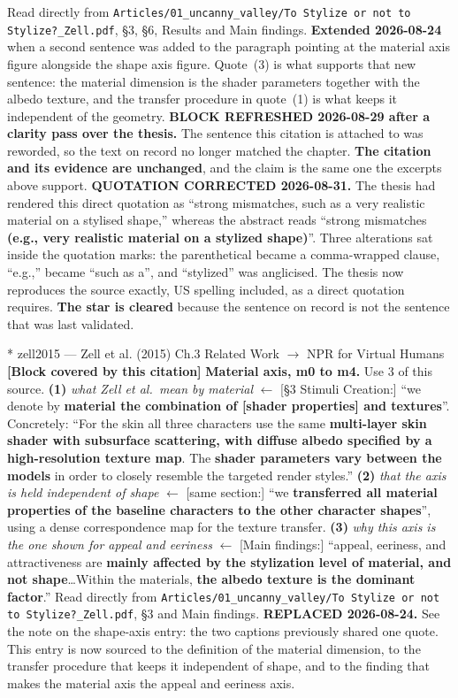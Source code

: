 \documentclass[11pt, a4paper]{article}
\makeatletter
\newcounter{citentry}
\newcommand{\citentry@core}[7]{%
  \stepcounter{citentry}
  \begingroup
  \sbox{\citentry@measurebox}{%
    \begin{minipage}{\linewidth}
      \noindent\colorbox{konstanzblue}{\parbox{\dimexpr\linewidth-2\fboxsep}{%
        \vspace{3pt}
        \textbf{\#\thecitentry \quad #2} \hfill \textit{#3}
        \vspace{3pt}
      }}
      \vspace{3pt}
      \noindent\begin{tabular}{@{}p{2.7cm} p{\dimexpr\linewidth-3cm}@{}}
        \textit{\small Sentence in thesis:} & #4 \\[5pt]
        \textbf{Usage:}\hfill       & #5 \\[5pt]
        \textit{\small Original source:}     & #6 \\[5pt]
        \textbf{How to check:}             & #7 \\
      \end{tabular}
      \vspace{5pt}
      \rule{10pt}{10pt}\quad \textbf{Validated} --- I have read the original and agree it supports the sentence.
    \end{minipage}%
  }%
  \Needspace{\dimexpr\ht\citentry@measurebox+\dp\citentry@measurebox\relax}%
  \endgroup
  \vspace{10pt}
  \noindent\colorbox{konstanzblue}{\parbox{\dimexpr\linewidth-2\fboxsep}{%
    \vspace{3pt}
    \textcolor{white}{\textbf{\#\thecitentry \quad #2}} \hfill \textcolor{white}{\textit{#3}}
    \vspace{3pt}
  }}
  \vspace{3pt}
  \noindent\begin{tabular}{@{}p{2.7cm} p{\dimexpr\linewidth-3cm}@{}}
    \textit{\small Sentence in thesis:} & \textcolor{darkgreen}{#4} \\[5pt]
    \textbf{Usage:}\hfill       & #5 \\[5pt]
    \textit{\small Original source:}     & \textcolor{darkred}{#6} \\[5pt]
    \textbf{How to check:}             & #7 \\
  \end{tabular}
  \vspace{5pt}
  \noindent\CheckBox[name=verified\thecitentry, width=10pt, height=10pt, bordercolor={0 0 0}, borderwidth=0.75, backgroundcolor={1 1 1}#1]{}\quad \textbf{Validated} --- I have read the original and agree it supports the sentence.
  \vspace{3pt}
  \noindent\textcolor{midgray}{\rule{\linewidth}{0.4pt}}
}
\newcommand{\citentry}{\@ifstar{\citentry@core{, checked}}{\citentry@core{}}}
\makeatother
\begin{document}
\begin{Form}
  {Read directly from \texttt{\footnotesize Articles/01\_uncanny\_valley/To Stylize or not to Stylize?\_Zell.pdf}, \S3, \S6, Results and Main findings. \textbf{Extended 2026-08-24} when a second sentence was added to the paragraph pointing at the material axis figure alongside the shape axis figure. Quote~(3) is what supports that new sentence: the material dimension is the shader parameters together with the albedo texture, and the transfer procedure in quote~(1) is what keeps it independent of the geometry. \textbf{BLOCK REFRESHED 2026-08-29 after a clarity pass over the thesis.} The sentence this citation is attached to was reworded, so the text on record no longer matched the chapter. \textbf{The citation and its evidence are unchanged}, and the claim is the same one the excerpts above support. \textbf{QUOTATION CORRECTED 2026-08-31.} The thesis had rendered this direct quotation as ``strong mismatches, such as a very realistic material on a stylised shape,'' whereas the abstract reads ``strong mismatches \textbf{(e.g., very realistic material on a stylized shape)}''. Three alterations sat inside the quotation marks: the parenthetical became a comma-wrapped clause, ``e.g.,'' became ``such as a'', and ``stylized'' was anglicised. The thesis now reproduces the source exactly, US spelling included, as a direct quotation requires. \textbf{The star is cleared} because the sentence on record is not the sentence that was last validated.}


\citentry*
  {zell2015 --- Zell et al. (2015)}
  {Ch.3 Related Work $\rightarrow$ NPR for Virtual Humans}
  {\textbf{[Block covered by this citation]} \textbf{{\footnotesize\captionsetup{type=figure}Material axis, m0 to m4.}}}
  {Use 3 of this source.}
  {\textbf{(1)} \emph{what Zell et al.\ mean by material} $\leftarrow$ [\S3 Stimuli Creation:] ``we denote by \textbf{material the combination of [shader properties] and textures}''. Concretely: ``For the skin all three characters use the same \textbf{multi-layer skin shader with subsurface scattering, with diffuse albedo specified by a high-resolution texture map}. The \textbf{shader parameters vary between the models} in order to closely resemble the targeted render styles.'' \quad \textbf{(2)} \emph{that the axis is held independent of shape} $\leftarrow$ [same section:] ``we \textbf{transferred all material properties of the baseline characters to the other character shapes}'', using a dense correspondence map for the texture transfer. \quad \textbf{(3)} \emph{why this axis is the one shown for appeal and eeriness} $\leftarrow$ [Main findings:] ``appeal, eeriness, and attractiveness are \textbf{mainly affected by the stylization level of material, and not shape}\ldots Within the materials, \textbf{the albedo texture is the dominant factor}.''}
  {Read directly from \texttt{\footnotesize Articles/01\_uncanny\_valley/To Stylize or not to Stylize?\_Zell.pdf}, \S3 and Main findings. \textbf{REPLACED 2026-08-24.} See the note on the shape-axis entry: the two captions previously shared one quote. This entry is now sourced to the definition of the material dimension, to the transfer procedure that keeps it independent of shape, and to the finding that makes the material axis the appeal and eeriness axis.}


\end{Form}
\end{document}
